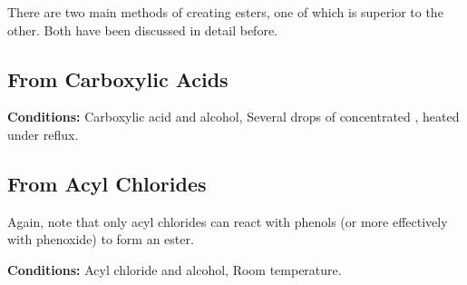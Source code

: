 		There are two main methods of creating esters, one of which is superior to the other. Both have been discussed in detail before.

		\subsection{From Carboxylic Acids}

			\vspace{1.5em}
			\vbox{\textbf{Conditions:}	\tabto{35mm}Carboxylic acid and alcohol,
										\tabto{35mm}Several drops of concentrated , heated under reflux.}



		\subsection{From Acyl Chlorides}

			Again, note that only acyl chlorides can react with phenols (or more effectively with phenoxide) to form an ester.

			\vspace{1.5em}
			\vbox{\textbf{Conditions:}	\tabto{35mm}Acyl chloride and alcohol,
										\tabto{35mm}Room temperature.}






